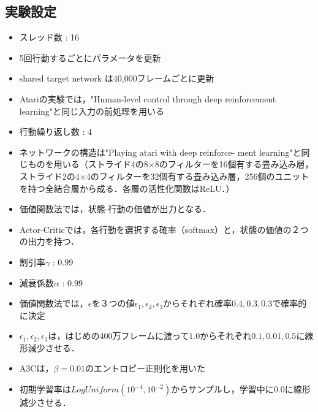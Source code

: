 \documentclass{jarticle}
\begin{document}
\subsection{実験設定}
\begin{itemize}
	\item スレッド数 : 16
	\item 5回行動するごとにパラメータを更新
	\item shared target network は40,000フレームごとに更新
	\item Atariの実験では，"Human-level control through deep reinforcement learning"と同じ入力の前処理を用いる
	\item 行動繰り返し数 : 4
	\item ネットワークの構造は"Playing atari with deep reinforce- ment learning"と同じものを用いる（ストライド4の8×8のフィルターを16個有する畳み込み層，ストライド2の4×4のフィルターを32個有する畳み込み層，256個のユニットを持つ全結合層から成る．各層の活性化関数はReLU．）
	\item 価値関数法では，状態-行動の価値が出力となる．
	\item Actor-Criticでは，各行動を選択する確率（softmax）と，状態の価値の２つの出力を持つ．
	\item 割引率$\gamma$ : $0.99$
	\item 減衰係数$\alpha$ : $0.99$
	\item 価値関数法では，$\epsilon$を３つの値$\epsilon_1,\epsilon_2,\epsilon_3$からそれぞれ確率$0.4,0.3,0.3$で確率的に決定
	\item $\epsilon_1,\epsilon_2,\epsilon_3$は，はじめの400万フレームに渡って$1.0$からそれぞれ$0.1,0.01,0.5$に線形減少させる．
	\item A3Cは，$\beta=0.01$のエントロピー正則化を用いた
	\item 初期学習率は$LogUniform(10^{-4},10^{-2})$からサンプルし，学習中に$0.0$に線形減少させる．
\end{itemize}
\end{document}
